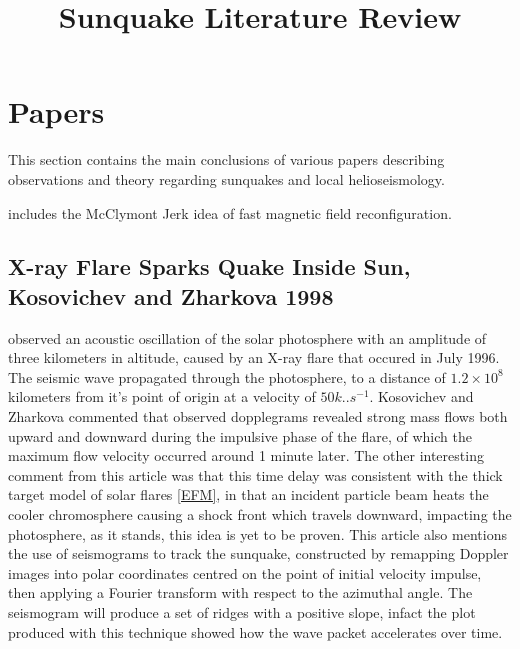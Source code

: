 

\title{Sunquake Literature Review}


\section{Papers}
This section contains the main conclusions of various papers describing observations and theory regarding sunquakes and local helioseismology.

\cite{1993SoPh..147..287A} includes the McClymont Jerk idea of fast magnetic field reconfiguration.

\subsection{X-ray Flare Sparks Quake Inside Sun, Kosovichev and Zharkova 1998}
\cite{1998Natur.393..317K} observed an acoustic oscillation of the solar photosphere with an amplitude of three kilometers in altitude, caused by an X-ray flare that occured in July 1996. The seismic wave propagated through the photosphere, to a distance of $1.2\times10^{8}$ kilometers from it's point of origin at a velocity of $50 k..s^{-1}$. Kosovichev and Zharkova commented that observed dopplegrams revealed strong mass flows both upward and downward during the impulsive phase of the flare, of which the maximum flow velocity occurred around 1 minute later. The other interesting comment from this article was that this time delay was consistent with the thick target model of solar flares \ref{EFM}, in that an incident particle beam heats the cooler chromosphere causing a shock front which travels downward, impacting the photosphere, as it stands, this idea is yet to be proven.
This article also mentions the use of seismograms to track the sunquake, constructed by remapping Doppler images into polar coordinates centred on the point of initial velocity impulse, then applying a Fourier transform with respect to the azimuthal angle. The seismogram will produce a set of ridges with a positive slope, infact the plot produced with this technique showed how the wave packet accelerates over time.

